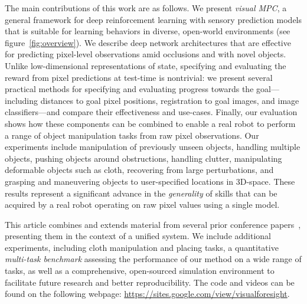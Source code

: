 The main contributions of this work are as follows. We present \emph{visual MPC}, a general framework for deep reinforcement learning with sensory prediction models that is suitable for learning behaviors in diverse, open-world environments (see figure~\ref{fig:overview}).
We describe deep network architectures that are effective for predicting pixel-level observations amid occlusions and with novel objects. Unlike low-dimensional representations of state, specifying and evaluating the reward from pixel predictions at test-time is nontrivial: we present several practical methods for specifying and evaluating progress towards the goal---including distances to goal pixel positions, registration to goal images, and image classifiers---and compare their effectiveness and use-cases.
Finally, our evaluation shows how these components can be combined to enable a real robot to perform a range of object manipulation tasks from raw pixel observations. Our experiments include manipulation of previously unseen objects, handling multiple objects, pushing objects around obstructions, handling clutter, manipulating deformable objects such as cloth, recovering from large perturbations, and grasping and maneuvering objects to user-specified locations in 3D-space. These results represent a significant advance in the \emph{generality} of skills that can be acquired by a real robot operating on raw pixel values using a single model.

This article combines and extends material from several prior conference papers~\cite{foresight,sna,ebert2018robustness,flo}, presenting them in the context of a unified system. We include additional experiments, including cloth manipulation and placing tasks, a quantitative \emph{multi-task benchmark} assessing the performance of our method on a wide range of tasks, as well as a comprehensive, open-sourced simulation environment to facilitate future research and better reproducibility. The code and videos can be found on the following webpage: \url{https://sites.google.com/view/visualforesight}.




 





